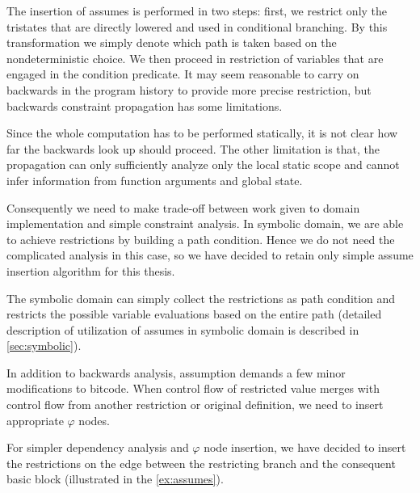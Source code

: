 The insertion of assumes is performed in two steps: first, we restrict only the
tristates that are directly lowered and used in conditional branching. By this
transformation we simply denote which path is taken based on the nondeterministic
choice. We then proceed in restriction of variables that are engaged in the condition
predicate. It may seem reasonable to carry on backwards in the program history to
provide more precise restriction, but backwards constraint propagation has some
limitations.

Since the whole computation has to be performed statically, it is not clear how far the
backwards look up should proceed. The other limitation is that, the propagation
can only sufficiently analyze only the local static scope and cannot infer
information from function arguments and global state.

Consequently we need to make trade-off between work given to domain
implementation and simple constraint analysis. In symbolic domain, we are able
to achieve restrictions by building a path condition. Hence we do not need the
complicated analysis in this case, so we have decided to retain only simple
assume insertion algorithm for this thesis.

The symbolic domain can simply collect the restrictions as path condition and
restricts the possible variable evaluations based on the entire path
(detailed description of utilization of assumes in symbolic domain is
described in \autoref{sec:symbolic}).

In addition to backwards analysis, assumption demands a few minor
modifications to bitcode. When control flow of restricted value merges with
control flow from another restriction or original definition, we need to insert
appropriate $\varphi$ nodes.

For simpler dependency analysis and $\varphi$ node insertion, we have decided
to insert the restrictions on the edge between the restricting branch and the consequent
basic block (illustrated in the \autoref{ex:assumes}).

